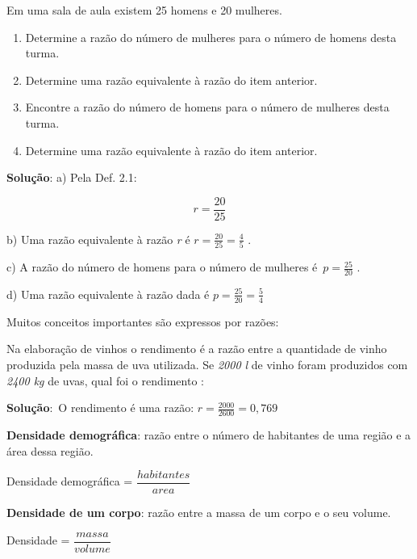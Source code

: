 \begin{texemplo} 
Em uma sala de aula existem 25 homens e 20 mulheres.

\begin{enumerate}[label=\arabic*]
	\item Determine a razão do número de mulheres para o número de homens desta turma.

	\item Determine uma razão equivalente à razão do item anterior.

	\item Encontre a razão do número de homens para o número de mulheres desta turma.

	\item Determine uma razão equivalente à razão do item anterior.\quad 
\end{enumerate}


\textbf{Solução}: a) Pela Def. 2.1: 

$$r=\frac{20}{25} $$

b) Uma razão equivalente à razão \textit{r} é  \( r=\frac{20}{25}=\frac{4}{5} \)  .

c) A razão do número de homens para o número de mulheres é\   \( p=\frac{25}{20} \) .

d) Uma razão equivalente à razão dada é  \( p=\frac{25}{20}=\frac{5}{4} \)  \qedsymbol{}

\end{texemplo}
Muitos conceitos importantes são expressos por razões:

\begin{texemplo} 
	Na elaboração de vinhos o rendimento é a razão entre a quantidade de vinho produzida pela massa de uva utilizada. Se \textit{2000 l} de vinho foram produzidos com \textit{2400 kg} de uvas, qual foi o rendimento :
	
\textbf{Solução}:\ O rendimento é uma razão:   \( r=\frac{2000}{2600}=0,769 \) \qedsymbol{}
\end{texemplo}

\textbf{Densidade demográfica}: razão entre o número de habitantes de uma região e a área dessa região.
\begin{caixa}
	Densidade demográfica = $\dfrac{habitantes}{area}$
\end{caixa}

\textbf{Densidade de um corpo}: razão entre a massa de um corpo e o seu volume.
\begin{caixa}
	Densidade = $\dfrac{massa}{volume}$
\end{caixa}

